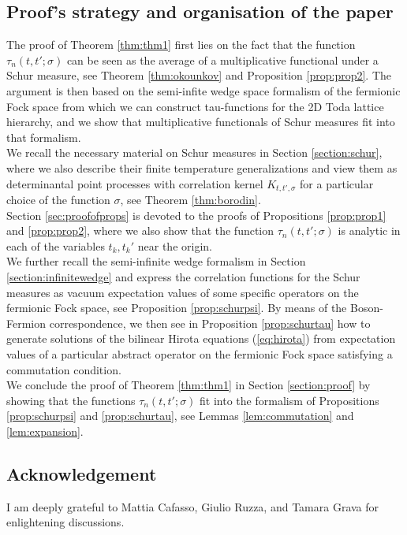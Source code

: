 \documentclass[12pt]{amsart}
\theoremstyle{definition}
\begin{document}
\subsection{Proof's strategy and organisation of the paper}
The proof of Theorem \ref{thm:thm1} first lies on the fact that the function $\tau_n(t,t';\sigma)$ can be seen as the average of a multiplicative functional  under a Schur measure, see Theorem \ref{thm:okounkov} and Proposition \ref{prop:prop2}. The argument is then based on the semi-infite wedge space formalism of the fermionic Fock space from which we can construct tau-functions for the 2D Toda lattice hierarchy, and we show that multiplicative functionals of Schur measures fit into that formalism.\\

We recall the necessary material on Schur measures in Section \ref{section:schur}, where we also describe their finite temperature generalizations and view them as determinantal point processes with correlation kernel $K_{t,t',\sigma}$ for a particular choice of the function $\sigma$, see Theorem \ref{thm:borodin}.\\

Section \ref{sec:proofofprops} is devoted to the proofs of Propositions \ref{prop:prop1} and \ref{prop:prop2}, where we also show that the function $\tau_n(t,t';\sigma)$ is analytic in each of the variables $t_k,t_k'$ near the origin.\\

We further recall the semi-infinite wedge formalism in Section \ref{section:infinitewedge} and express the correlation functions for the Schur measures as vacuum expectation values of some specific operators on the fermionic Fock space, see Proposition \ref{prop:schurpsi}. By means of the Boson-Fermion correspondence, we then see in Proposition \ref{prop:schurtau} how to generate solutions of the bilinear Hirota equations (\ref{eq:hirota}) from expectation values of a particular abstract operator on the fermionic Fock space satisfying a commutation condition.\\

We conclude the proof of Theorem \ref{thm:thm1} in Section \ref{section:proof} by showing that the functions $ \tau_n(t,t';\sigma)$ fit into the formalism of Propositions \ref{prop:schurpsi} and \ref{prop:schurtau}, see Lemmas \ref{lem:commutation} and \ref{lem:expansion}.\\

\subsection*{Acknowledgement} I am deeply grateful to Mattia Cafasso, Giulio Ruzza, and Tamara Grava for enlightening discussions.
\end{document}
